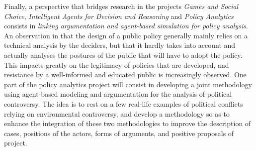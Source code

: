 
Finally, a perspective that bridges research in the projects {\em Games and Social Choice}, {\em Intelligent Agents for Decision and Reasoning} and {\em Policy Analytics} consists in  {\em linking argumentation and agent-based simulation for policy analysis}.
An observation in that the design of a public policy generally mainly relies on a technical analysis by the deciders, but that it hardly takes into account and actually analyses the postures of the public that will have to adopt the policy. This impacts greatly on the legitimacy of policies that are developed, and resistance by a well-informed and educated public is increasingly observed. One part of the policy analytics project will consist in developing a joint methodology using agent-based modeling and argumentation for the analysis of political controversy. The idea is to rest on a few real-life examples of political conflicts relying on environmental controversy, and develop a methodology so as to enhance the integration of these two methodologies to improve the description of cases, positions of the actors, forms of arguments, and positive proposals of project. 

